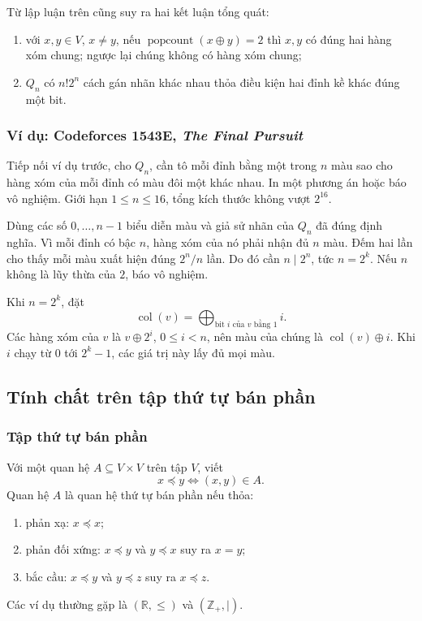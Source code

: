 \documentclass[11pt]{article}
\begin{document}
Từ lập luận trên cũng suy ra hai kết luận tổng quát:
\begin{enumerate}
  \item với \(x,y\in V\), \(x\ne y\), nếu
  \(\operatorname{popcount}(x\oplus y)=2\) thì \(x,y\) có đúng hai hàng xóm
  chung; ngược lại chúng không có hàng xóm chung;
  \item \(Q_n\) có \(n!2^n\) cách gán nhãn khác nhau thỏa điều kiện hai đỉnh
  kề khác đúng một bit.
\end{enumerate}

\subsubsection{Ví dụ: Codeforces 1543E, \emph{The Final Pursuit}}

Tiếp nối ví dụ trước, cho \(Q_n\), cần tô mỗi đỉnh bằng một trong \(n\) màu sao
cho hàng xóm của mỗi đỉnh có màu đôi một khác nhau. In một phương án hoặc báo
vô nghiệm. Giới hạn \(1\le n\le 16\), tổng kích thước không vượt \(2^{16}\).

Dùng các số \(0,\ldots,n-1\) biểu diễn màu và giả sử nhãn của \(Q_n\) đã đúng
định nghĩa. Vì mỗi đỉnh có bậc \(n\), hàng xóm của nó phải nhận đủ \(n\) màu.
Đếm hai lần cho thấy mỗi màu xuất hiện đúng \(2^n/n\) lần. Do đó cần
\(n\mid 2^n\), tức \(n=2^k\). Nếu \(n\) không là lũy thừa của \(2\), báo vô
nghiệm.

Khi \(n=2^k\), đặt
\[
  \operatorname{col}(v)=
  \bigoplus_{\text{bit }i\text{ của }v\text{ bằng }1} i.
\]
Các hàng xóm của \(v\) là \(v\oplus 2^i\), \(0\le i<n\), nên màu của chúng là
\(\operatorname{col}(v)\oplus i\). Khi \(i\) chạy từ \(0\) tới \(2^k-1\), các
giá trị này lấy đủ mọi màu.

\subsection{Tính chất trên tập thứ tự bán phần}

\subsubsection{Tập thứ tự bán phần}

Với một quan hệ \(A\subseteq V\times V\) trên tập \(V\), viết
\[
  x\preceq y \Longleftrightarrow (x,y)\in A.
\]
Quan hệ \(A\) là quan hệ thứ tự bán phần nếu thỏa:
\begin{enumerate}
  \item phản xạ: \(x\preceq x\);
  \item phản đối xứng: \(x\preceq y\) và \(y\preceq x\) suy ra \(x=y\);
  \item bắc cầu: \(x\preceq y\) và \(y\preceq z\) suy ra \(x\preceq z\).
\end{enumerate}
Các ví dụ thường gặp là \((\mathbb R,\le)\) và \((\mathbb Z_+, \mid)\).
\end{document}
